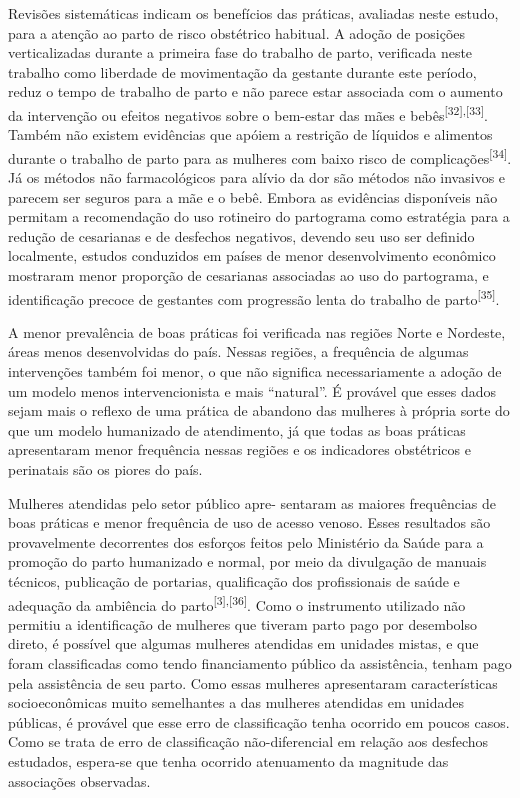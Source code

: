 \documentclass{article}
\begin{document}
Revisões sistemáticas indicam os benefícios das práticas, avaliadas neste
estudo,
para a atenção ao parto de risco obstétrico habitual. A adoção de posições
verticalizadas durante a primeira fase do trabalho de parto, verificada neste
trabalho como liberdade de movimentação da gestante durante este período, reduz
o
tempo de trabalho de parto e não parece estar associada com o aumento da
intervenção
ou efeitos negativos sobre o bem-estar das mães e bebês\textsuperscript{[}\textsuperscript{32}\textsuperscript{]}\textsuperscript{,}\textsuperscript{[}\textsuperscript{33}\textsuperscript{]}. Também não existem evidências que apóiem a restrição
de líquidos e alimentos durante o trabalho de parto para as mulheres com baixo
risco
de complicações\textsuperscript{[}\textsuperscript{34}\textsuperscript{]}. Já os métodos
não farmacológicos para alívio da dor são métodos não invasivos e parecem ser
seguros para a mãe e o bebê. Embora as evidências disponíveis não permitam a
recomendação do uso rotineiro do partograma como estratégia para a redução de
cesarianas e de desfechos negativos, devendo seu uso ser definido localmente,
estudos conduzidos em países de menor desenvolvimento econômico mostraram menor
proporção de cesarianas associadas ao uso do partograma, e identificação precoce
de
gestantes com progressão lenta do trabalho de parto\textsuperscript{[}\textsuperscript{35}\textsuperscript{]}.

A menor prevalência de boas práticas foi verificada nas regiões Norte e
Nordeste,
áreas menos desenvolvidas do país. Nessas regiões, a frequência de algumas
intervenções também foi menor, o que não significa necessariamente a adoção de
um
modelo menos intervencionista e mais “natural”. É provável que esses dados sejam
mais o reflexo de uma prática de abandono das mulheres à própria sorte do que um
modelo humanizado de atendimento, já que todas as boas práticas apresentaram
menor
frequência nessas regiões e os indicadores obstétricos e perinatais são os
piores do
país.

Mulheres atendidas pelo setor público apre- sentaram as maiores frequências de
boas
práticas e menor frequência de uso de acesso venoso. Esses resultados são
provavelmente decorrentes dos esforços feitos pelo Ministério da Saúde para a
promoção do parto humanizado e normal, por meio da divulgação de manuais
técnicos,
publicação de portarias, qualificação dos profissionais de saúde e adequação da
ambiência do parto\textsuperscript{[}\textsuperscript{3}\textsuperscript{]}\textsuperscript{,}\textsuperscript{[}\textsuperscript{36}\textsuperscript{]}. Como o instrumento utilizado não permitiu a identificação
de mulheres que tiveram parto pago por desembolso direto, é possível que algumas
mulheres atendidas em unidades mistas, e que foram classificadas como tendo
financiamento público da assistência, tenham pago pela assistência de seu parto.
Como essas mulheres apresentaram características socioeconômicas muito
semelhantes a
das mulheres atendidas em unidades públicas, é provável que esse erro de
classificação tenha ocorrido em poucos casos. Como se trata de erro de
classificação
não-diferencial em relação aos desfechos estudados, espera-se que tenha ocorrido
atenuamento da magnitude das associações observadas.
\end{document}
